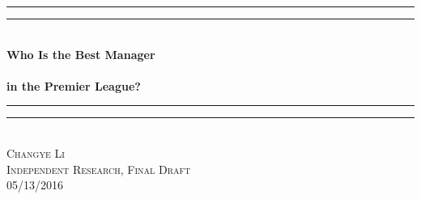 \documentclass[11pt]{report}
\newlength{\drop}
\begin{document}
	\linespread{2}
  \begin{titlepage}
    \textheight
    \centering
    \vspace*{\baselineskip}
    \rule{\textwidth}{1.6pt}\vspace*{-\baselineskip}\vspace*{2pt}
    \rule{\textwidth}{0.4pt}\\[\baselineskip]
    { {\Large \textbf{Who Is the Best Manager}} \\  [0.3\baselineskip]{\Large \textbf{}} \\[0.3\baselineskip] {\Large  \textbf{in the Premier League?}}}\\[0.2\baselineskip]
    \rule{\textwidth}{0.4pt}\vspace*{-\baselineskip}\vspace{3.2pt}
    \rule{\textwidth}{1.6pt}\\[\baselineskip]
    \scshape
    {\Large Changye Li} \\
    {\Large Independent Research, Final Draft}\\ 
   {\Large  05/13/2016} \\
    
  \end{titlepage}
\end{document}
